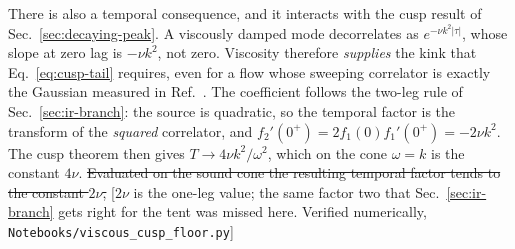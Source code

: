 \documentclass[10pt,prd,aps,nobibnotes,superscriptaddress,preprintnumbers,notitlepage]{revtex4-1}
\newcommand{\add}[1]{{\color{red}#1}}
\newcommand{\del}[1]{{\color{red}\sout{#1}}}
\newcommand{\why}[1]{{\color{red}\footnotesize\textsf{[#1]}}}
\newcommand{\add}[1]{#1}
\newcommand{\del}[1]{}
\newcommand{\why}[1]{}
\begin{document}
There is also a temporal consequence, and it interacts with the cusp result of
Sec.~\ref{sec:decaying-peak}. A viscously damped mode decorrelates as
$e^{-\nu k^{2}|\tau|}$, whose slope at zero lag is $-\nu k^{2}$, not zero. Viscosity
therefore \emph{supplies} the kink that Eq.~\eqref{eq:cusp-tail} requires, even for a
flow whose sweeping correlator is exactly the Gaussian measured in
Ref.~\cite{Auclair:2022jod}.
\add{The coefficient follows the two-leg rule of Sec.~\ref{sec:ir-branch}: the source is
quadratic, so the temporal factor is the transform of the \emph{squared} correlator, and
$f_2'(0^{+})=2f_1(0)f_1'(0^{+})=-2\nu k^{2}$. The cusp theorem then gives
$T\to4\nu k^{2}/\omega^{2}$, which on the cone $\omega=k$ is the constant $4\nu$.}
\del{Evaluated on the sound cone the resulting temporal factor tends to the constant
$2\nu$,}
\why{$2\nu$ is the one-leg value; the same factor two that Sec.~\ref{sec:ir-branch}
gets right for the tent was missed here. Verified numerically,
\texttt{Notebooks/viscous\_cusp\_floor.py}}
\end{document}

